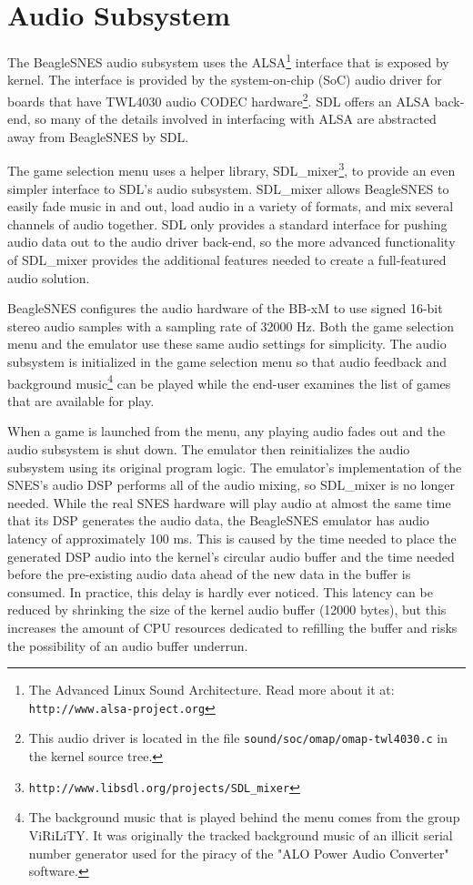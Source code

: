 \section{Audio Subsystem}

The BeagleSNES audio subsystem uses the ALSA\footnote{The Advanced Linux Sound Architecture.  Read more about it at: \texttt{http://www.alsa-project.org}} interface that is exposed by kernel.  The interface is provided by the system-on-chip (SoC) audio driver for boards that have TWL4030 audio CODEC hardware\footnote{This audio driver is located in the file \texttt{sound/soc/omap/omap-twl4030.c} in the kernel source tree.}.  SDL offers an ALSA back-end, so many of the details involved in interfacing with ALSA are abstracted away from BeagleSNES by SDL. 

The game selection menu uses a helper library, SDL\_mixer\footnote{\texttt{http://www.libsdl.org/projects/SDL\_mixer}}, to provide an even simpler interface to SDL's audio subsystem.  SDL\_mixer allows BeagleSNES to easily fade music in and out, load audio in a variety of formats, and mix several channels of audio together.  SDL only provides a standard interface for pushing audio data out to the audio driver back-end, so the more advanced functionality of SDL\_mixer provides the additional features needed to create a full-featured audio solution.

BeagleSNES configures the audio hardware of the BB-xM to use signed 16-bit stereo audio samples with a sampling rate of 32000 Hz.  Both the game selection menu and the emulator use these same audio settings for simplicity.  The audio subsystem is initialized in the game selection menu so that audio feedback and background music\footnote{The background music that is played behind the menu comes from the group ViRiLiTY.  It was originally the tracked background music of an illicit serial number generator used for the piracy of the "ALO Power Audio Converter" software.} can be played while the end-user examines the list of games that are available for play.  

When a game is launched from the menu, any playing audio fades out and the audio subsystem is shut down.  The emulator then reinitializes the audio subsystem using its original program logic.  The emulator's implementation of the SNES's audio DSP performs all of the audio mixing, so SDL\_mixer is no longer needed.  While the real SNES hardware will play audio at almost the same time that its DSP generates the audio data, the BeagleSNES emulator has audio latency of approximately 100 ms.  This is caused by the time needed to place the generated DSP audio into the kernel's circular audio buffer and the time needed before the pre-existing audio data ahead of the new data in the buffer is consumed.  In practice, this delay is hardly ever noticed.  This latency can be reduced by shrinking the size of the kernel audio buffer (12000 bytes), but this increases the amount of CPU resources dedicated to refilling the buffer and risks the possibility of an audio buffer underrun.


